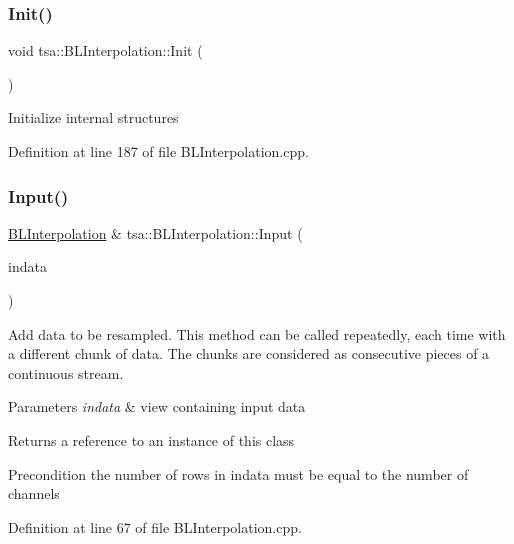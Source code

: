 \subsubsection{\texorpdfstring{Init()}{Init()}}
{\footnotesize\ttfamily void tsa\+::\+B\+L\+Interpolation\+::\+Init (\begin{DoxyParamCaption}{ }\end{DoxyParamCaption})\hspace{0.3cm}{\ttfamily [private]}}

Initialize internal structures 

Definition at line 187 of file B\+L\+Interpolation.\+cpp.

\mbox{\label{classtsa_1_1_b_l_interpolation_ad4ce3e5cb5bc89e8de11a0dc1d54121e}} 
\subsubsection{\texorpdfstring{Input()}{Input()}}
{\footnotesize\ttfamily \hyperlink{classtsa_1_1_b_l_interpolation}{B\+L\+Interpolation} \& tsa\+::\+B\+L\+Interpolation\+::\+Input (\begin{DoxyParamCaption}\item[{\hyperlink{namespacetsa_ac599574bcc094eda25613724b8f3ca9e}{Seq\+View\+Double} \&}]{indata }\end{DoxyParamCaption})}

Add data to be resampled. This method can be called repeatedly, each time with a different chunk of data. The chunks are considered as consecutive pieces of a continuous stream.


\begin{DoxyParams}{Parameters}
{\em indata} & view containing input data\\
\hline
\end{DoxyParams}
\begin{DoxyReturn}{Returns}
a reference to an instance of this class
\end{DoxyReturn}
\begin{DoxyPrecond}{Precondition}
the number of rows in indata must be equal to the number of channels 
\end{DoxyPrecond}


Definition at line 67 of file B\+L\+Interpolation.\+cpp.

